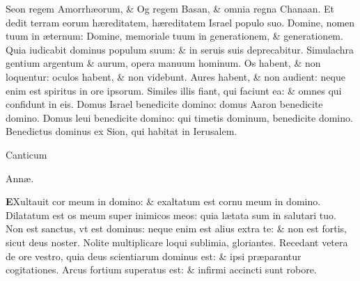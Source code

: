 \documentclass[a5paper,10pt]{book}
\def\ae{æ}
\begin{document}
\begin{multicols*}{2}
\newline \color{red} S\color{black}eon regem Amorrh\ae orum, \& Og regem Basan, \& omnia regna Chanaan.
\newline \color{red} E\color{black}t dedit terram eorum h\ae reditatem, h\ae reditatem Israel populo suo.
\newline \color{red} D\color{black}omine, nomen tuum in \ae ternum: Domine, memoriale tuum in generationem, \& generationem.
\newline \color{red} Q\color{black}uia iudicabit dominus populum suum: \& in seruis suis deprecabitur.
\newline \color{red} S\color{black}imulachra gentium argentum \& aurum, opera manuum hominum.
\newline \color{red} O\color{black}s habent, \& non loquentur: oculos habent, \& non videbunt.
\newline \color{red} A\color{black}ures habent, \& non audient: neque enim est spiritus in ore ipsorum.
\newline \color{red} S\color{black}imiles illis fiant, qui faciunt ea: \& omnes qui confidunt in eis.
\newline \color{red} D\color{black}omus Israel benedicite domino: domus Aaron benedicite domino.
\newline \color{red} D\color{black}omus leui benedicite domino: qui timetis dominum, benedicite domino.
\newline \color{red} B\color{black}enedictus dominus ex Sion, qui habitat in Ierusalem.
\vspace{-1em}
\begin{center} \color{red}
\hypertarget{Anna}{Canticum} Ann\ae .
\end{center}
\vspace{-1em}
\lettrine[lines=2]{\bfseries \color{red} E}{}Xultauit cor meum in domino: \& exaltatum est cornu meum in domino.%
\newline \color{red} D\color{black}ilatatum est os meum super inimicos meos: quia l\ae tata sum in salutari tuo.
\newline \color{red} N\color{black}on est sanctus, vt est dominus: neque enim est alius extra te: \& non est fortis, sicut deus noster.
\newline \color{red} N\color{black}olite multiplicare loqui sublimia, gloriantes.
\newline \color{red} R\color{black}ecedant vetera de ore vestro, quia deus scientiarum dominus est: \& ipsi pr\ae parantur cogitationes.
\newline \color{red} A\color{black}rcus fortium superatus est: \& infirmi accincti sunt robore.

\end{multicols*}
\end{document}
